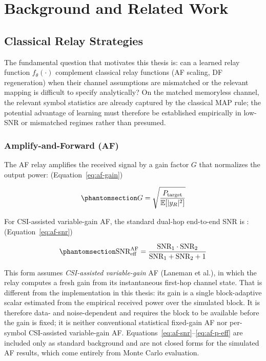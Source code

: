 \chapter{Background and Related Work}\label{sec:literature-review}

\section{Classical Relay Strategies}\label{sec:classical-relay-strategies}

The fundamental question that motivates this thesis is: can a learned relay function \(f_\theta(\cdot)\) complement classical relay functions (AF scaling, DF regeneration) when their channel assumptions are mismatched or the relevant mapping is difficult to specify analytically? On the matched memoryless channel, the relevant symbol statistics are already captured by the classical MAP rule; the potential advantage of learning must therefore be established empirically in low-SNR or mismatched regimes rather than presumed.

\subsection{Amplify-and-Forward (AF)}\label{sec:classical-relay-strategies-af}

The AF relay amplifies the received signal by a gain factor \(G\) that normalizes the output power: (Equation~\ref{eq:af-gain})

\begin{equation}\protect\phantomsection\label{eq:af-gain}{G = \sqrt{\frac{P_{\text{target}}}{\mathbb{E}[|y_R|^2]}}
}\end{equation}

For CSI-assisted variable-gain AF, the standard dual-hop end-to-end SNR is \cite{Laneman2004CooperativeDiversity,TseViswanath2005Fundamentals}: (Equation~\ref{eq:af-snr})

\begin{equation}\protect\phantomsection\label{eq:af-snr}{\text{SNR}_{\text{eff}}^{\text{AF}} = \frac{\text{SNR}_1 \cdot \text{SNR}_2}{\text{SNR}_1 + \text{SNR}_2 + 1}
}\end{equation}

This form assumes \emph{CSI-assisted variable-gain} AF (Laneman et al.), in which the relay computes a fresh gain from its instantaneous first-hop channel state. That is different from the implementation in this thesis: its gain is a single block-adaptive scalar estimated from the empirical received power over the simulated block. It is therefore data- and noise-dependent and requires the block to be available before the gain is fixed; it is neither conventional statistical fixed-gain AF nor per-symbol CSI-assisted variable-gain AF. Equations~\ref{eq:af-snr}--\ref{eq:af-p-eff} are included only as standard background and are not closed forms for the simulated AF results, which come entirely from Monte Carlo evaluation.

